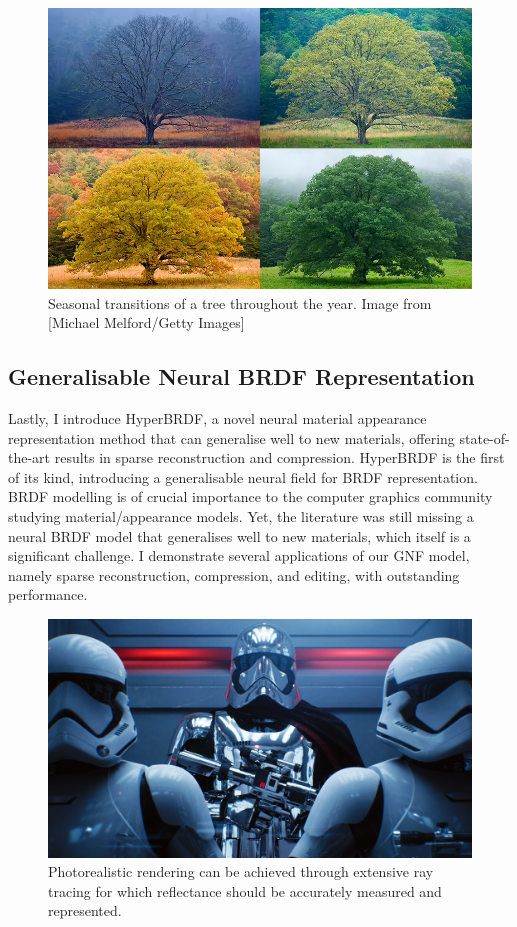 \begin{figure}[ht]
  \centering

    \includegraphics[width=0.6\linewidth]{Images/seasonchanges.png}

   \caption{Seasonal transitions of a tree throughout the year. Image from [Michael Melford/Getty Images]}
   \label{fig:colour-approximate}
\end{figure}

\subsection{Generalisable Neural BRDF Representation}
Lastly, I introduce HyperBRDF, a novel neural material appearance representation method that can generalise well to new materials, offering state-of-the-art results in sparse reconstruction and compression. HyperBRDF is the first of its kind, introducing a generalisable neural field for BRDF representation. BRDF modelling is of crucial importance to the computer graphics community studying material/appearance models. Yet, the literature was still missing a neural BRDF model that generalises well to new materials, which itself is a significant challenge. I demonstrate several applications of our GNF model, namely sparse reconstruction, compression, and editing, with outstanding performance. 

\begin{figure}[ht]
  \centering

    \includegraphics[width=\linewidth]{Images/StarWars-RayTracing.jpeg}

   \caption{Photorealistic rendering can be achieved through extensive ray tracing for which reflectance should be accurately measured and represented.}
   \label{fig:colour-approximate}
\end{figure}



